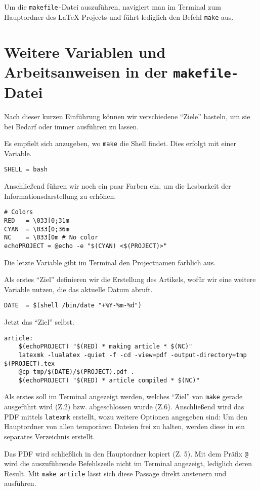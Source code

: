 \documentclass[ngerman]{dtk}
\begin{document}
Um die \texttt{makefile-}Datei auszuführen,
navigiert man im Terminal zum Hauptordner des \LaTeX -Projects
und führt lediglich den Befehl \texttt{make} aus.


\section{Weitere Variablen und Arbeitsanweisen in der \texttt{makefile-}Datei}
Nach dieser kurzen Einführung können wir verschiedene \enquote{Ziele}
basteln, um sie bei Bedarf oder immer ausführen zu lassen.

Es empfielt sich anzugeben, wo \texttt{make} die Shell findet.
Dies erfolgt mit einer Variable.
\begin{lstlisting}[style=number]
SHELL = bash
\end{lstlisting}

Anschließend führen wir noch ein paar Farben ein,
um die Lesbarkeit der Informationsdarstellung zu erhöhen.
\begin{lstlisting}[style=number]
# Colors
RED   = \033[0;31m
CYAN  = \033[0;36m
NC    = \033[0m # No color
echoPROJECT = @echo -e "$(CYAN) <$(PROJECT)>"
\end{lstlisting}
Die letzte Variable gibt im Terminal den Projectnamen farblich aus.

Als erstes \enquote{Ziel} definieren wir die Erstellung des Artikels,
wofür wir eine weitere Variable nutzen, die das aktuelle Datum abruft.
\begin{lstlisting}[style=number]
DATE  = $(shell /bin/date "+%Y-%m-%d")
\end{lstlisting}

Jetzt das \enquote{Ziel} selbst.
\begin{lstlisting}[style=number]
article:
	$(echoPROJECT) "$(RED) * making article * $(NC)"
	latexmk -lualatex -quiet -f -cd -view=pdf -output-directory=tmp $(PROJECT).tex
	@cp tmp/$(DATE)/$(PROJECT).pdf .
	$(echoPROJECT) "$(RED) * article compiled * $(NC)"
\end{lstlisting}
Als erstes soll im Terminal angezeigt werden, welches \enquote{Ziel}
von \texttt{make} gerade ausgeführt  wird (Z.2) bzw. abgeschlossen wurde (Z.6).
Anschließend wird das PDF mittels \texttt{latexmk} erstellt, wozu weitere Optionen angegeben sind:
Um den Hauptordner von allen temporären Dateien frei zu halten,
werden diese in ein separates Verzeichnis erstellt.

Das PDF wird schließlich in den Hauptordner kopiert (Z. 5).
Mit dem Präfix \texttt{@} wird die auszuführende Befehlszeile nicht
im Terminal angezeigt, lediglich deren Result.
Mit \texttt{make article} lässt sich diese Passage direkt ansteuern und ausführen.
\end{document}
